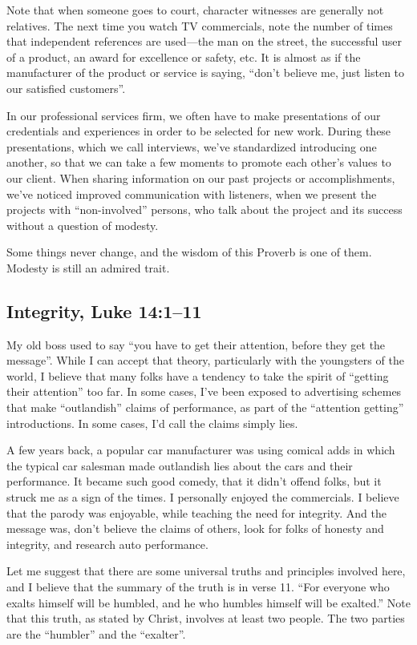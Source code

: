 \documentclass[12pt]{memoir}
\begin{document}
Note that when someone goes to court, character witnesses are generally
not relatives. The next time you watch TV commercials, note the number
of times that independent references are used---the man on the street,
the successful user of a product, an award for excellence or safety,
etc. It is almost as if the manufacturer of the product or service
is saying, ``don't believe me, just listen to our satisfied customers''. 

In our professional services firm, we often have to make presentations
of our credentials and experiences in order to be selected for new
work. During these presentations, which we call interviews, we've
standardized introducing one another, so that we can take a few moments
to promote each other's values to our client. When sharing information
on our past projects or accomplishments, we've noticed improved communication
with listeners, when we present the projects with ``non-involved''
persons, who talk about the project and its success without a question
of modesty. 

Some things never change, and the wisdom of this Proverb is one of
them. Modesty is still an admired trait. 

\subsection[]{Integrity, Luke 14:1--11}


My old boss used to say ``you have to get their attention, before
they get the message''. While I can accept that theory, particularly
with the youngsters of the world, I believe that many folks have a
tendency to take the spirit of ``getting their attention'' too far.
In some cases, I've been exposed to advertising schemes that make
``outlandish'' claims of performance, as part of the ``attention
getting'' introductions. In some cases, I'd call the claims simply
lies.

A few years back, a popular car manufacturer was using comical adds
in which the typical car salesman made outlandish lies about the cars
and their performance. It became such good comedy, that it didn't
offend folks, but it struck me as a sign of the times. I personally
enjoyed the commercials. I believe that the parody was enjoyable,
while teaching the need for integrity. And the message was, don't
believe the claims of others, look for folks of honesty and integrity,
and research auto performance.

Let me suggest that there are some universal truths and principles
involved here, and I believe that the summary of the truth is in verse
11. ``For everyone who exalts himself will be humbled, and he who
humbles himself will be exalted.'' Note that this truth, as stated
by Christ, involves at least two people. The two parties are the ``humbler''
and the ``exalter''. 
\end{document}
